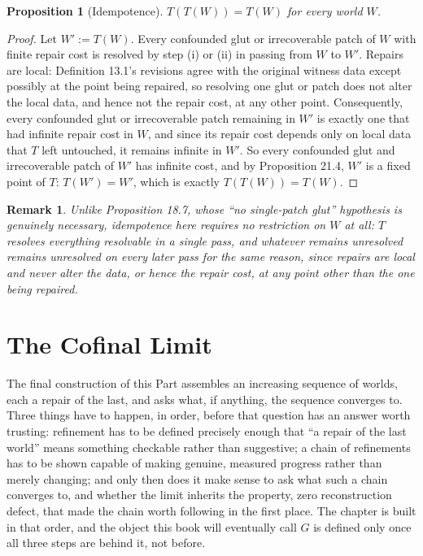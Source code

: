 \documentclass[11pt]{book}
\newtheorem{proposition}[theorem]{Proposition}
\newtheorem{remark}[theorem]{Remark}
\begin{document}
\begin{proposition}[Idempotence]
$T(T(W)) = T(W)$ for every world $W$.
\end{proposition}

\begin{proof}
Let $W' := T(W)$. Every confounded glut or irrecoverable patch of $W$ with finite repair cost is resolved by step (i) or (ii) in passing from $W$ to $W'$. Repairs are local: Definition 13.1's revisions agree with the original witness data except possibly at the point being repaired, so resolving one glut or patch does not alter the local data, and hence not the repair cost, at any other point. Consequently, every confounded glut or irrecoverable patch remaining in $W'$ is exactly one that had infinite repair cost in $W$, and since its repair cost depends only on local data that $T$ left untouched, it remains infinite in $W'$. So every confounded glut and irrecoverable patch of $W'$ has infinite cost, and by Proposition 21.4, $W'$ is a fixed point of $T$: $T(W') = W'$, which is exactly $T(T(W)) = T(W)$.
\end{proof}

\begin{remark}
Unlike Proposition 18.7, whose ``no single-patch glut'' hypothesis is genuinely necessary, idempotence here requires no restriction on $W$ at all: $T$ resolves everything resolvable in a single pass, and whatever remains unresolved remains unresolved on every later pass for the same reason, since repairs are local and never alter the data, or hence the repair cost, at any point other than the one being repaired.
\end{remark}

\chapter{The Cofinal Limit}

The final construction of this Part assembles an increasing sequence of worlds, each a repair of the last, and asks what, if anything, the sequence converges to. Three things have to happen, in order, before that question has an answer worth trusting: refinement has to be defined precisely enough that ``a repair of the last world'' means something checkable rather than suggestive; a chain of refinements has to be shown capable of making genuine, measured progress rather than merely changing; and only then does it make sense to ask what such a chain converges to, and whether the limit inherits the property, zero reconstruction defect, that made the chain worth following in the first place. The chapter is built in that order, and the object this book will eventually call $G$ is defined only once all three steps are behind it, not before.
\end{document}
